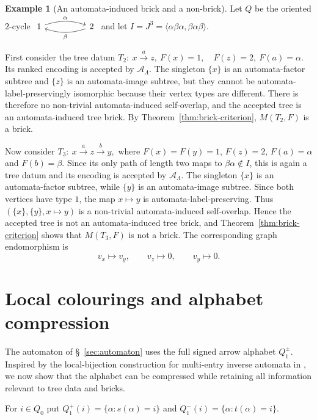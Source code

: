 \documentclass[11pt,a4paper]{amsart}
\theoremstyle{definition}
\newtheorem{example}[definition]{Example}
\theoremstyle{plain}
\theoremstyle{remark}
\numberwithin{equation}{section}
\begin{document}
\begin{example}[An automata-induced brick and a non-brick]\label{ex:brick-nonbrick}
Let $Q$ be the oriented $2$-cycle
$
\begin{tikzcd}[column sep=huge]
1 \arrow[r,bend left=18,"\alpha"] & 2 \arrow[l,bend left=18,"\beta"]
\end{tikzcd}
$
and let $I=J^3=\langle\alpha\beta\alpha,\beta\alpha\beta\rangle$.

First consider the tree datum $T_2:\ x\xrightarrow{a}z,\ 
F(x)=1,\quad F(z)=2,\  F(a)=\alpha.$ Its ranked encoding is accepted by $\mathcal A_\Lambda$. The singleton $\{x\}$ is an automata-factor subtree and $\{z\}$ is an automata-image subtree, but they cannot be automata-label-preservingly isomorphic because their vertex types are different. There is therefore no non-trivial automata-induced self-overlap, and the accepted tree is an automata-induced tree brick. By Theorem~\ref{thm:brick-criterion}, $M(T_2,F)$ is a brick.

Now consider
$
T_3:\  x\xrightarrow{a}z\xrightarrow{b}y,
$
where $F(x)=F(y)=1$, $F(z)=2$, $F(a)=\alpha$ and $F(b)=\beta$. Since its only path of length two maps to $\beta\alpha\notin I$, this is again a tree datum and its encoding is accepted by $\mathcal A_\Lambda$. The singleton $\{x\}$ is an automata-factor subtree, while $\{y\}$ is an automata-image subtree. Since both vertices have type $1$, the map $x\mapsto y$ is automata-label-preserving. Thus
$
(\{x\},\{y\},x\mapsto y)
$
is a non-trivial automata-induced self-overlap. Hence the accepted tree is not an automata-induced tree brick, and Theorem~\ref{thm:brick-criterion} shows that $M(T_3,F)$ is not a brick. The corresponding graph endomorphism is
$$
v_x\longmapsto v_y,\qquad
v_z\longmapsto0,\qquad
v_y\longmapsto0.
$$
\end{example}
\section{Local colourings and alphabet compression}
\label{sec:compression}

The automaton of \S~\ref{sec:automaton} uses the full signed arrow alphabet $Q_1^{\pm}$. Inspired by the local-bijection construction for multi-entry inverse automata in \cite[Definition~4.11]{KuberSengupta2026}, we now show that the alphabet can be compressed while retaining all information relevant to tree data and bricks.

For $i\in Q_0$ put $Q_1^+(i)=\{\alpha:s(\alpha)=i\}$ and $Q_1^-(i)=\{\alpha:t(\alpha)=i\}$.
\end{document}
